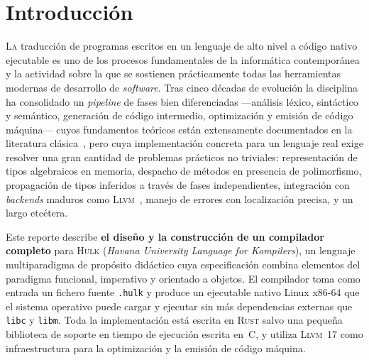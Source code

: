 \documentclass[11pt,a4paper,oneside,openany]{report}
\newcommand{\hulk}{\textsc{Hulk}}
\newcommand{\code}[1]{\texttt{#1}}
\newcommand{\rust}{\textsc{Rust}}
\newcommand{\llvm}{\textsc{Llvm}}
\begin{document}
\tableofcontents

\cleardoublepage

\chapter{Introducción}

\lettrine[lines=2,findent=2pt,nindent=0pt]{L}{a} traducción de programas escritos en
un lenguaje de alto nivel a código nativo ejecutable es uno de los procesos
fundamentales de la informática contemporánea y la actividad sobre la que se
sostienen prácticamente todas las herramientas modernas de desarrollo de
\textit{software}. Tras cinco décadas de evolución la disciplina ha consolidado un
\textit{pipeline} de fases bien diferenciadas ---análisis léxico, sintáctico y
semántico, generación de código intermedio, optimización y emisión de código
máquina--- cuyos fundamentos teóricos están extensamente documentados en la
literatura clásica~\cite{aho2006,cooper2011,appel1998}, pero cuya implementación
concreta para un lenguaje real exige resolver una gran cantidad de problemas
prácticos no triviales: representación de tipos algebraicos en memoria, despacho
de métodos en presencia de polimorfismo, propagación de tipos inferidos a través
de fases independientes, integración con \textit{backends} maduros como
\llvm{}~\cite{lattner2004}, manejo de errores con localización precisa, y un largo
etcétera.

Este reporte describe \textbf{el diseño y la construcción de un compilador
completo} para \hulk{} (\textit{Havana University Language for Kompilers}), un
lenguaje multiparadigma de propósito didáctico cuya especificación combina
elementos del paradigma funcional, imperativo y orientado a objetos. El compilador toma como entrada un fichero fuente \texttt{.hulk} y
produce un ejecutable nativo Linux x86-64 que el sistema operativo puede cargar y
ejecutar sin más dependencias externas que \code{libc} y \code{libm}. Toda la
implementación está escrita en \rust{} salvo una pequeña biblioteca de soporte en
tiempo de ejecución escrita en~C, y utiliza \llvm{}~17 como infraestructura para
la optimización y la emisión de código máquina.
\end{document}
